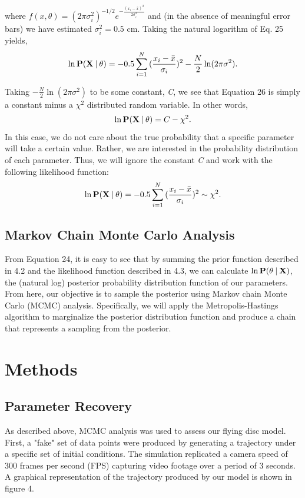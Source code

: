 \documentclass[a4paper,12pt, oneside]{article}
\newcommand\givenbase[1][]{\:#1\lvert\:}
\let\given\givenbase
\begin{document}
where $f(x,\theta)=(2\pi\sigma_{i}^2)^{-1/2}e^{-\frac{(x_{i}-\bar{x})^2}{2\sigma_i^2}}$ and (in the absence of meaningful error bars) we have estimated $\sigma_i^2=0.5$ cm. Taking the natural logarithm of Eq. 25 yields,
\begin{equation}
\ln\bold{P({X}\given\theta)}={-0.5 \sum_{i=1}^{N} {(\frac { x_i-\bar{x} } {\sigma_{i}}})^2} - \frac{N}{2}\ln(2\pi\sigma^2).
\end{equation}

Taking $-\frac{N}{2}\ln(2\pi\sigma^2)$ to be some constant, \textit{C}, we see that Equation 26 is simply a constant minus a $\chi^2$ distributed random variable. In other words, 
\begin{equation*}
\ln\bold{P({X}\given\theta)}=C-\chi^2.
\end{equation*}
In this case, we do not care about the true probability that a specific parameter will take a certain value. Rather, we are interested in the probability distribution of each parameter. Thus, we will ignore the constant \textit{C} and work with the following likelihood function:
\begin{equation}
\ln\bold{P({X}\given\theta)}={-0.5 \sum_{i=1}^{N} {(\frac { x_i-\bar{x} } {\sigma_{i}}})^2} \sim \chi^2.
\end{equation}
\subsection{Markov Chain Monte Carlo Analysis}
From Equation 24, it is easy to see that by summing the prior function described in 4.2 and the likelihood function described in 4.3, we can calculate $\ln\bold{P}(\theta\given\bold{X})$, the (natural log) posterior probability distribution function of our parameters. From here, our objective is to sample the posterior using Markov chain Monte Carlo (MCMC) analysis. Specifically, we will apply the Metropolis-Hastings algorithm to marginalize the posterior distribution function and produce a chain that represents a sampling from the posterior.

\section{Methods}
\subsection{Parameter Recovery}
As described above, MCMC analysis was used to assess our flying disc model. First, a "fake" set of data points were produced by generating a trajectory under a specific set of initial conditions. The simulation replicated a camera speed of 300 frames per second (FPS) capturing video footage over a period of 3 seconds. A graphical representation of the trajectory produced by our model is shown in figure 4. 
\end{document}
